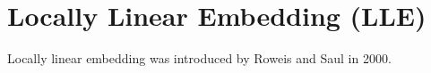 \section{Locally Linear Embedding (LLE)\label{Sec:DR:LLE}}
Locally linear embedding was introduced by Roweis and Saul in 2000.\cite{RoweisScience2000}